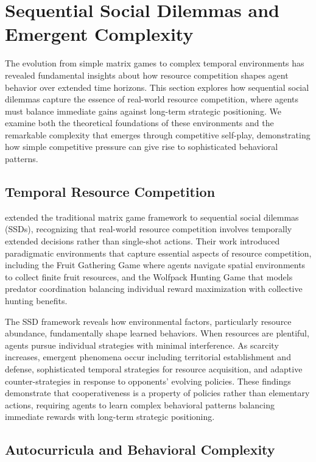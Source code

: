 \section{Sequential Social Dilemmas and Emergent Complexity}

The evolution from simple matrix games to complex temporal environments has revealed fundamental insights about how resource competition shapes agent behavior over extended time horizons. This section explores how sequential social dilemmas capture the essence of real-world resource competition, where agents must balance immediate gains against long-term strategic positioning. We examine both the theoretical foundations of these environments and the remarkable complexity that emerges through competitive self-play, demonstrating how simple competitive pressure can give rise to sophisticated behavioral patterns.


\subsection{Temporal Resource Competition}

\textcite{leibo_multi-agent_2017} extended the traditional matrix game framework to sequential social dilemmas (SSDs), recognizing that real-world resource competition involves temporally extended decisions rather than single-shot actions. Their work introduced paradigmatic environments that capture essential aspects of resource competition, including the Fruit Gathering Game where agents navigate spatial environments to collect finite fruit resources, and the Wolfpack Hunting Game that models predator coordination balancing individual reward maximization with collective hunting benefits.

The SSD framework reveals how environmental factors, particularly resource abundance, fundamentally shape learned behaviors. When resources are plentiful, agents pursue individual strategies with minimal interference. As scarcity increases, emergent phenomena occur including territorial establishment and defense, sophisticated temporal strategies for resource acquisition, and adaptive counter-strategies in response to opponents' evolving policies. These findings demonstrate that cooperativeness is a property of policies rather than elementary actions, requiring agents to learn complex behavioral patterns balancing immediate rewards with long-term strategic positioning.

\subsection{Autocurricula and Behavioral Complexity}

